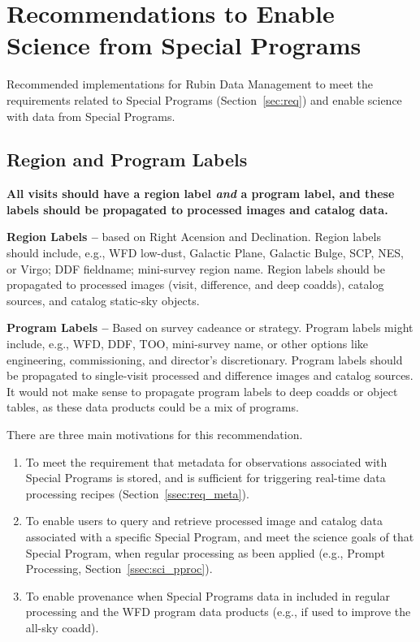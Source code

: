 \section{Recommendations to Enable Science from Special Programs}\label{sec:sci}

Recommended implementations for Rubin Data Management to meet the 
requirements related to Special Programs (Section~\ref{sec:req})
and enable science with data from Special Programs.

\subsection{Region and Program Labels}\label{ssec:sci_labels}

\textbf{All visits should have a region label \textit{and} a program 
label, and these labels should be propagated to processed images and catalog data.}

\textbf{Region Labels -- } based on Right Acension and Declination.
Region labels should include, e.g., WFD low-dust, Galactic Plane, Galactic 
Bulge, SCP, NES, or Virgo; DDF fieldname; mini-survey region name.
Region labels should be propagated to processed images (visit, 
difference, and deep coadds), catalog sources, and catalog static-sky objects. 

\textbf{Program Labels -- } 
Based on survey cadeance or strategy.
Program labels might include, e.g., WFD, DDF, TOO, mini-survey name, or other 
options like engineering, commissioning, and director's discretionary.
Program labels should be propagated to single-visit processed and 
difference images and catalog sources.
It would not make sense to propagate program labels to deep coadds or 
object tables, as these data products could be a mix of programs.

There are three main motivations for this recommendation.

\begin{enumerate}

\item To meet the requirement that metadata for observations associated 
with Special Programs is stored, and is sufficient for triggering 
real-time data processing recipes (Section~\ref{ssec:req_meta}).

\item To enable users to query and retrieve processed image and catalog
data associated with a specific Special Program, and meet the science goals
of that Special Program, when regular processing as been applied 
(e.g., Prompt Processing, Section~\ref{ssec:sci_pproc}).

\item To enable provenance when Special Programs data in included in regular
processing and the WFD program data products (e.g., if used to improve the
all-sky coadd).

\end{enumerate}

